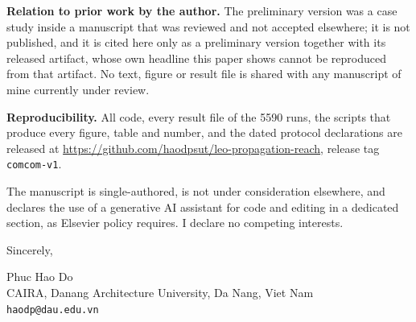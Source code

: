 \documentclass[11pt,a4paper]{article}
\begin{document}
\textbf{Relation to prior work by the author.} The preliminary version was a case study inside a
manuscript that was reviewed and not accepted elsewhere; it is not published, and it is cited here
only as a preliminary version together with its released artifact, whose own headline this paper
shows cannot be reproduced from that artifact. No text, figure or result file is shared with any
manuscript of mine currently under review.

\textbf{Reproducibility.} All code, every result file of the 5590 runs, the scripts that produce
every figure, table and number, and the dated protocol declarations are released at
\url{https://github.com/haodpsut/leo-propagation-reach}, release tag \texttt{comcom-v1}.

The manuscript is single-authored, is not under consideration elsewhere, and declares the use of a
generative AI assistant for code and editing in a dedicated section, as Elsevier policy requires.
I declare no competing interests.

Sincerely,

Phuc Hao Do\\
CAIRA, Danang Architecture University, Da Nang, Viet Nam\\
\texttt{haodp@dau.edu.vn}
\end{document}
